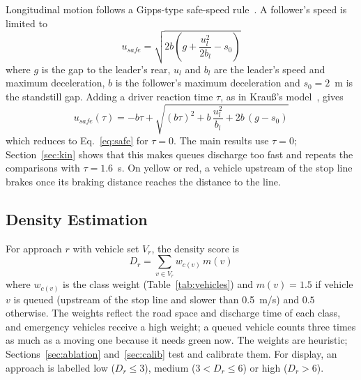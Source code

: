 Longitudinal motion follows a Gipps-type safe-speed rule~\cite{ref21}. A follower's speed is limited to
\begin{equation}
u_{safe} = \sqrt{2b\left(g + \frac{u_l^{2}}{2b_l} - s_0\right)}
\label{eq:safe}
\end{equation}
where $g$ is the gap to the leader's rear, $u_l$ and $b_l$ are the leader's speed and maximum deceleration, $b$ is the follower's maximum deceleration and $s_0 = 2$~m is the standstill gap. Adding a driver reaction time $\tau$, as in Krau{\ss}'s model~\cite{ref25}, gives
\begin{equation}
u_{safe}(\tau) = -b\tau + \sqrt{(b\tau)^2 + b\,\frac{u_l^{2}}{b_l} + 2b\,(g - s_0)}
\label{eq:safetau}
\end{equation}
which reduces to Eq.~\eqref{eq:safe} for $\tau = 0$. The main results use $\tau = 0$; Section~\ref{sec:kin} shows that this makes queues discharge too fast and repeats the comparisons with $\tau = 1.6$~s. On yellow or red, a vehicle upstream of the stop line brakes once its braking distance reaches the distance to the line.

\subsection{Density Estimation}
For approach $r$ with vehicle set $V_r$, the density score is
\begin{equation}
D_r = \sum_{v\in V_r} w_{c(v)}\, m(v)
\label{eq:density}
\end{equation}
where $w_{c(v)}$ is the class weight (Table~\ref{tab:vehicles}) and $m(v) = 1.5$ if vehicle $v$ is queued (upstream of the stop line and slower than 0.5~m/s) and $0.5$ otherwise. The weights reflect the road space and discharge time of each class, and emergency vehicles receive a high weight; a queued vehicle counts three times as much as a moving one because it needs green now. The weights are heuristic; Sections~\ref{sec:ablation} and~\ref{sec:calib} test and calibrate them. For display, an approach is labelled low ($D_r \le 3$), medium ($3 < D_r \le 6$) or high ($D_r > 6$).

